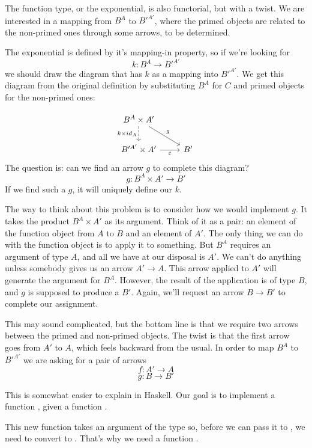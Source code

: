 \documentclass[DaoFP]{subfiles}
\begin{document}
The function type, or the exponential, is also functorial, but with a twist. We are interested in a mapping from $B^A$ to $B'^{A'}$, where the primed objects are related to the non-primed ones through some arrows, to be determined. 

The exponential is defined by it's mapping-in property, so if we're looking for
\[k \colon B^A \to B'^{A'} \]
we should draw the diagram that has $k$ as a mapping into $B'^{A'}$. We get this diagram from the original definition by substituting $B^A$ for $C$ and primed objects for the non-primed ones:

\[
 \begin{tikzcd}
 B^A \times A'
 \arrow[d, dashed, "k \times id_A"']
 \arrow[rd, "g"]
 \\
 B'^{A'} \times A'
 \arrow[r, "\varepsilon"']
& B'
 \end{tikzcd}
\]
The question is: can we find an arrow $g$ to complete this diagram? 
\[g \colon B^A \times A' \to B'\]
If we find such a $g$, it will uniquely define our $k$.

The way to think about this problem is to consider how we would implement $g$. It takes the product $B^A \times A'$ as its argument. Think of it as a pair: an element of the function object from $A$ to $B$ and an element of $A'$. The only thing we can do with the function object is to apply it to something. But $B^A$ requires an argument of type $A$, and all we have at our disposal is $A'$. We can't do anything unless somebody gives us an arrow $A' \to A$. This arrow applied to $A'$ will generate the argument for $B^A$. However, the result of the application is of type $B$, and $g$ is supposed to produce a $B'$. Again, we'll request an arrow $B \to B'$ to complete our assignment. 

This may sound complicated, but the bottom line is that we require two arrows between the primed and non-primed objects. The twist is that the first arrow goes from $A'$ to $A$, which feels backward from the usual. In order to map $B^A$ to $B'^{A'}$ we are asking for a pair of arrows
\[f \colon A' \to A\]
\[g \colon B \to B' \]

This is somewhat easier to explain in Haskell. Our goal is to implement a function , given a function . 

This new function takes an argument of the type  so, before we can pass it to , we need to convert  to . That's why we need a function . 
\end{document}
